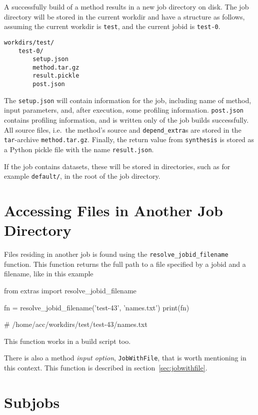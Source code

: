 A successfully build of a method results in a new job directory on
disk.  The job directory will be stored in the current workdir and
have a structure as follows, assuming the current workdir
is \texttt{test}, and the current jobid is \texttt{test-0}.
\begin{verbatim}
workdirs/test/
    test-0/
        setup.json
        method.tar.gz
        result.pickle
        post.json
\end{verbatim}
The \texttt{setup.json} will contain information for the job,
including name of method, input parameters, and, after execution, some
profiling information.  \texttt{post.json} contains profiling
information, and is written only of the job builds successfully.  All
source files, i.e.\ the method's source and \texttt{depend\_extra}s
are stored in the \texttt{tar}-archive \texttt{method.tar.gz}.
Finally, the return value from \texttt{synthesis} is stored as a
Python pickle file with the name \texttt{result.json}.

If the job contains datasets, these will be stored in directories,
such as for example \texttt{default/}, in the root of the job
directory.



\section{Accessing Files in Another Job Directory}
Files residing in another job is found using the
\texttt{resolve\_jobid\_filename} function.  This function returns the
full path to a file specified by a jobid and a filename, like in this
example
\begin{python}
from extras import resolve_jobid_filename

fn = resolve_jobid_filename('test-43', 'names.txt')
print(fn)

# /home/acc/workdirs/test/test-43/names.txt
\end{python}
This function works in a build script too.

There is also a method \textsl{input option}, \texttt{JobWithFile}, that is
worth mentioning in this context.  This function is described in
section~\ref{sec:jobwithfile}.




\section{Subjobs}
\label{sec:subjobs}

